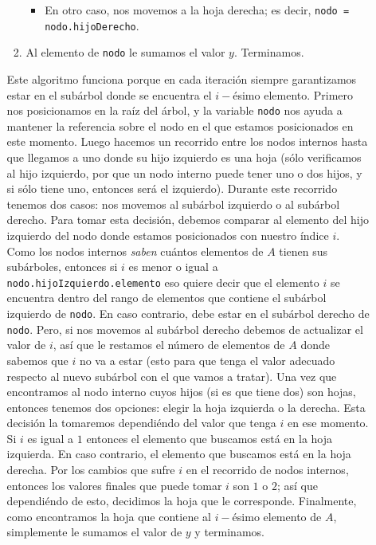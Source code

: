 \documentclass[letterpaper,11pt]{article}
\begin{document}
\begin{enumerate}
\begin{itemize}
\begin{enumerate}
\begin{itemize}
                \item En otro caso, nos movemos a la hoja derecha; es decir, 
                \texttt{nodo = nodo.hijoDerecho}.
            \end{itemize}

            \item Al elemento de \texttt{nodo} le sumamos el valor $y$. 
            Terminamos. 
        \end{enumerate}

        Este algoritmo funciona porque en cada iteración siempre garantizamos 
        estar en el subárbol donde se encuentra el $i-$ésimo elemento. Primero 
        nos posicionamos en la raíz del árbol, y la variable \texttt{nodo} nos 
        ayuda a mantener la referencia sobre el nodo en el que estamos 
        posicionados en este momento. Luego hacemos un recorrido entre los
        nodos internos hasta que llegamos a uno donde su hijo izquierdo es 
        una hoja (sólo verificamos al hijo izquierdo, por que un nodo interno 
        puede tener uno o dos hijos, y si sólo tiene uno, entonces será el 
        izquierdo). Durante este recorrido tenemos dos casos: nos movemos al 
        subárbol izquierdo o al subárbol derecho. Para tomar esta decisión, 
        debemos comparar al elemento del hijo izquierdo del nodo donde estamos 
        posicionados con nuestro índice $i$. Como los nodos internos 
        \textit{saben} cuántos elementos de $A$ tienen sus subárboles, 
        entonces si $i$ es menor o igual a \texttt{nodo.hijoIzquierdo.elemento}
        eso quiere decir que el elemento $i$ se encuentra dentro del rango 
        de elementos que contiene el subárbol izquierdo de \texttt{nodo}. En 
        caso contrario, debe estar en el subárbol derecho de \texttt{nodo}. 
        Pero, si nos movemos al subárbol derecho debemos de actualizar el 
        valor de $i$, así que le restamos el número de elementos de $A$ donde 
        sabemos que $i$ no va a estar (esto para que tenga el valor adecuado 
        respecto al nuevo subárbol con el que vamos a tratar). Una vez que 
        encontramos al nodo interno cuyos hijos (si es que tiene dos) son 
        hojas, entonces tenemos dos opciones: elegir la hoja izquierda o la 
        derecha. Esta decisión la tomaremos dependiéndo del valor que tenga 
        $i$ en ese momento. Si $i$ es igual a $1$ entonces el elemento que 
        buscamos está en la hoja izquierda. En caso contrario, el elemento que 
        buscamos está en la hoja derecha. Por los cambios que sufre $i$ en el 
        recorrido de nodos internos, entonces los valores finales que puede 
        tomar $i$ son $1$ o $2$; así que dependiéndo de esto, decidimos la 
        hoja que le corresponde. Finalmente, como encontramos la hoja que
        contiene al $i-$ésimo elemento de $A$, simplemente le sumamos el 
        valor de $y$ y terminamos. 


\end{itemize}
\end{enumerate}
\end{document}
